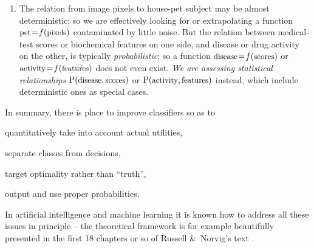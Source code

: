 \documentclass[\ifafour a4paper,12pt,\else a5paper,10pt,\fi%
onecolumn,oneside,article,%
british%
]{memoir}
\theoremstyle{remark}
\theoremstyle{innote}
\newcommand*{\amp}{\&}
\renewcommand*{\P}{\mathrm{P}}%
\renewcommand*{\|}[1][]{\nonscript\:#1\vert\nonscript\:\mathopen{}}
\newcommand*{\mo}[1][=]{\mathrel{\mkern-3.5mu#1\mkern-3.5mu}}
\newcommand*{\texts}[1]{\text{\small #1}}
\begin{document}
\begin{enumerate}[label=(\roman*),wide]
  
\item\label{item:determ_statist} The relation from image pixels to house-pet subject may be almost deterministic; so we are effectively looking for or extrapolating a function $\texts{pet} \mo f(\texts{pixels})$ contaminated by little noise. But the relation between medical-test scores or biochemical features on one side, and disease or drug activity on the other, is typically \emph{probabilistic}; so a function $\texts{disease} \mo f(\texts{scores})$
  or $\texts{activity} \mo f(\texts{features})$
  does not even exist. \emph{We are assessing statistical relationships} $\P(\texts{disease} , \texts{scores})$ or $\P(\texts{activity} , \texts{features})$ instead, which include deterministic ones as special cases.

\end{enumerate}

In summary, there is place to improve classifiers so as to
\begin{enumerate*}[label=(\roman*)]
\item quantitatively take into account actual utilities,
\item separate classes from decisions,
\item target optimality rather than \enquote{truth}, %
\item output and use proper probabilities.
\end{enumerate*}

\medskip

In artificial intelligence and machine learning it is known how to address all these issues in principle -- the theoretical framework is for example beautifully presented in the first 18 chapters or so of Russell \amp\ Norvig's \parencites*{russelletal1995_r2022} text \autocites[see also]{selfetal1987,cheeseman1988,cheeseman1995_r2018,pearl1988,mackay1995_r2005}.
\end{document}
